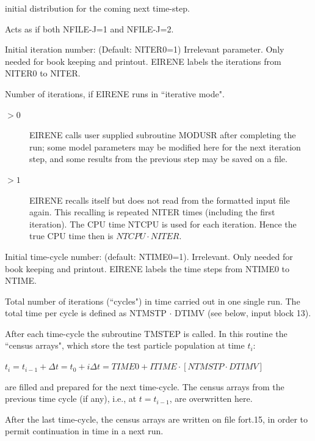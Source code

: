 \begin{description}
\begin{description}
                initial distribution for the coming next time-step.
          \item [J = 3 ] Acts as if both NFILE-J=1 and NFILE-J=2.
        \end{description}
  \item[NITER0] Initial iteration number: (Default: NITER0=1) Irrelevant
        parameter.
        Only needed for book keeping and printout.
        EIRENE labels the iterations from NITER0 to NITER.
  \item[NITER] Number of iterations, if EIRENE runs in ``iterative mode".
        \begin{description}
          \item[$> 0$] EIRENE calls user supplied subroutine MODUSR after completing the
                run; some model parameters may be modified here for the next iteration step,
                and some results from the previous step may be saved on a file.
          \item[$> 1$] EIRENE recalls itself but does not read from the formatted input
                file again.
                This recalling is repeated NITER times (including the first iteration).
                The CPU time NTCPU is used for each iteration.
                Hence the true CPU time then is $ NTCPU \cdot NITER $.
        \end{description}
  \item[NTIME0] Initial time-cycle number: (default: NTIME0=1).
        Irrelevant.
        Only needed for book keeping and printout.
        EIRENE labels the time steps from NTIME0 to NTIME.
  \item[NTIME] Total number of iterations (``cycles") in time carried out in one
        single run.
        The total time per cycle is defined as NTMSTP $\cdot$ DTIMV (see below, input
        block 13).

        After each time-cycle the subroutine TMSTEP is called.
        In this routine the ``census arrays", which store the test particle population
        at time $t_i$:

        $t_{i} = t_{i-1} + \Delta t = t_0 + i \Delta t = TIME0 + ITIME \cdot [NTMSTP
            \cdot DTIMV]$ 

        are filled and prepared for the next time-cycle.
        The census arrays from the previous time cycle (if any), i.e., at $t =
          t_{i-1}$, are overwritten here.

        After the last time-cycle, the census arrays are written on file fort.15, in
        order to permit continuation in time in a next run.


\end{description}

